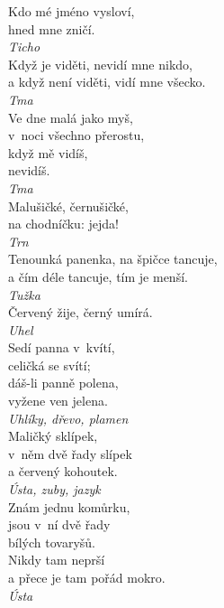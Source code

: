 \begin{multicols}{\value{columnsthindata}}
\noindent
Kdo mé jméno vysloví,\\
hned mne zničí.\\[1 mm]
{\sl Ticho}\\

\noindent
Když je viděti, nevidí mne nikdo,\\
a když není viděti, vidí mne všecko.\\[1 mm]
{\sl Tma}\\

\noindent
Ve dne malá jako myš,\\
v~noci všechno přerostu,\\
když mě vidíš,\\
nevidíš.\\[1 mm]
{\sl Tma}\\

\noindent
Malušičké, černušičké,\\
na chodníčku: jejda!\\[1 mm]
{\sl Trn}\\

\noindent
Tenounká panenka, na špičce tancuje,\\
a čím déle tancuje, tím je menší.\\[1 mm]
{\sl Tužka}\\

\noindent
Červený žije, černý umírá.\\[1 mm]
{\sl Uhel}\\

\noindent
Sedí panna v~kvítí,\\
celičká se svítí;\\
dáš-li panně polena,\\
vyžene ven jelena.\\[1 mm]
{\sl Uhlíky, dřevo, plamen}\\

\noindent
Maličký sklípek,\\
v~něm dvě řady slípek\\
a červený kohoutek.\\[1 mm]
{\sl Ústa, zuby, jazyk}\\

\noindent
Znám jednu komůrku,\\
jsou v~ní dvě řady\\
bílých tovaryšů.\\
Nikdy tam neprší\\
a přece je tam pořád mokro.\\[1 mm]
{\sl Ústa}\\


\end{multicols}

